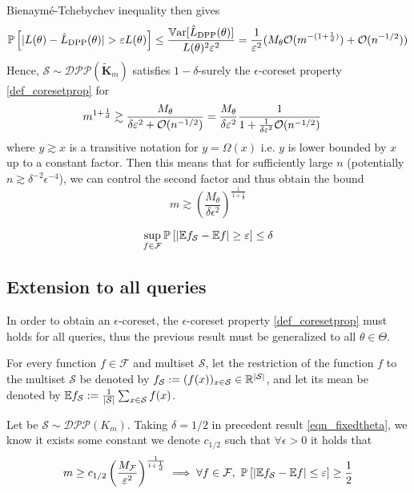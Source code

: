 Bienaym\'e-Tchebychev inequality then gives
\begin{equation}
	\PP \left[|L(\theta)-\hat L_{\textrm{DPP}}(\theta)|>\epsilon L(\theta)\right] \leq \frac{\Var[ \hat L_{\textrm{DPP}}(\theta) ] }{L(\theta)^{2}\varepsilon ^{2}} = \frac {1} {\epsilon^2}(M_\theta \OO( m ^{-(1+\frac 1 d)}) + \OO( n^{-1/2}))
\end{equation}
Hence, $\mathcal{S} \sim \mathcal{DPP}(\tilde{\boldsymbol K}_m)$ satisfies $1-\delta$-surely the $\epsilon$-coreset property \ref{def_coresetprop} for
\begin{align}
	m^{1+\frac 1 d} &\gtrsim \frac{M_\theta}{\delta \varepsilon^2 + \mathcal{O}(n^{-1/2})} = \frac {M_\theta} {\delta\varepsilon^2} \frac{1}{1 + \frac{1}{\delta \varepsilon^2}\mathcal{O}(n^{-1/2})}
\end{align} 
where $y \gtrsim x$ is a transitive notation for $y = \Omega(x)$ i.e. $y$ is lower bounded by $x$ up to a constant factor.
Then this means that for sufficiently large $n$ (potentially $n\gtrsim \delta^{-2} \epsilon^{-4}$), we can control the second factor and thus obtain the bound
\begin{equation}
	\boxed{m \gtrsim \left(\frac{M_\theta}{\delta\epsilon^2} \right)^{\frac{1}{1+\frac 1 d}} }
	\label{eqn_fixedtheta}
\end{equation}
\begin{lemma}
	\begin{equation}
		\sup_{f \in \mathcal{F}} \mathbb{P}_{}\left[\lvert \mathbb{E}{f_{\mathcal{S}}} - \mathbb{E}{f} \rvert \geq \varepsilon\right] \leq \delta
	\end{equation}
\end{lemma}


\subsection{Extension to all queries}
In order to obtain an $\epsilon$-coreset, the $\epsilon$-coreset property \ref{def_coresetprop} must holds for all queries, thus the previous result must be generalized to all $\theta \in \Theta$.

For every function $f \in \mathcal{F}$ and multiset $\mathcal{S}$, let the restriction of the function $f$ to the multiset $\mathcal{S}$ be denoted by $f_{\mathcal{S}} := (f(x))_{x \in \mathcal{S}} \in \mathbb{R}^{|\mathcal{S} |}$, and let its mean be denoted by $\mathbb{E} f_\mathcal{S} := \frac{1}{|\mathcal{S}|} \sum_{x \in \mathcal{S}} f(x)$.

\begin{corollary}
	Let be $\mathcal{S} \sim  \mathcal{DPP}(K_m)$. Taking $\delta = 1/2$ in precedent result \ref{eqn_fixedtheta}, we know it exists some constant we denote $c_{1/2}$ such that $\forall \epsilon>0$ it holds that
	\begin{equation}
		m \geq c_{1/2} \left(\frac{M_{\mathcal{F}}}{\varepsilon^2} \right)^{\frac{1}{1+\frac 1 d}} \implies \forall f\in \mathcal{F},\ \mathbb{P}_{}\left[ \lvert \mathbb{E} {f_{\mathcal{S}}} - \mathbb{E} f \rvert \leq \varepsilon\right] \geq \frac 1 2
	\end{equation} 
\end{corollary}

